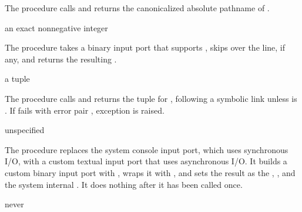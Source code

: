 The  procedure calls 
and returns the canonicalized absolute pathname of .

\begin{procedure}
\end{procedure}
\returns{} an exact nonnegative integer

The  procedure takes a binary input port
 that supports , skips over the
 line, if any, and returns the
resulting .

\begin{procedure}
\end{procedure}
\returns{} a  tuple

The  procedure calls  and returns
the  tuple for , following a symbolic link
unless  is . If  fails
with error pair , exception
 is raised.

\begin{procedure}
\end{procedure}
\returns{} unspecified

The  procedure replaces the system console
input port, which uses synchronous I/O, with a custom textual input
port that uses asynchronous I/O. It builds a custom binary input port
with , wraps it with , and
sets the result as the ,
, and the system internal
. It does nothing after it has been called
once.

\begin{procedure}
\end{procedure}
\returns{} never

